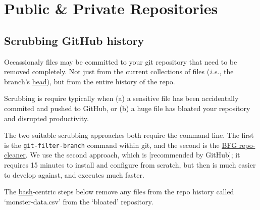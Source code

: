 \documentclass[]{book}
\begin{document}
\hypertarget{public-private-repositories}{%
\section{Public \& Private Repositories}\label{public-private-repositories}}

\hypertarget{scrubbing-github-history}{%
\subsection{Scrubbing GitHub history}\label{scrubbing-github-history}}

Occassionaly files may be committed to your git repository that need to be removed completely. Not just from the current collections of files (\emph{i.e.}, the branch's \href{https://git-scm.com/docs/gitglossary\#gitglossary-aiddefHEADaHEAD}{head}), but from the entire history of the repo.

Scrubbing is require typically when (a) a sensitive file has been accidentally commited and pushed to GitHub, or (b) a huge file has bloated your repository and disrupted productivity.

The two suitable scrubbing approaches both require the command line. The first is the \texttt{git-filter-branch} command within git, and the second is the \href{https://rtyley.github.io/bfg-repo-cleaner/}{BFG repo-cleaner}. We use the second approach, which is {[}recommended by GitHub{]}; it requires 15 minutes to install and configure from scratch, but then is much easier to develop against, and executes much faster.

The \href{https://www.gnu.org/software/bash/}{bash}-centric steps below remove any file\emph{s} from the repo history called `monster-data.csv' from the `bloated' repository.
\end{document}
